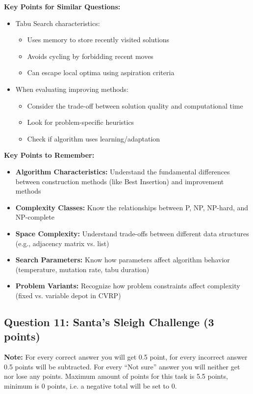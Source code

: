 \begin{enumerate}[label=\alph*)]
\textbf{Key Points for Similar Questions:}
\begin{itemize}
\item Tabu Search characteristics:
  \begin{itemize}
  \item Uses memory to store recently visited solutions
  \item Avoids cycling by forbidding recent moves
  \item Can escape local optima using aspiration criteria
  \end{itemize}
\item When evaluating improving methods:
  \begin{itemize}
  \item Consider the trade-off between solution quality and computational time
  \item Look for problem-specific heuristics
  \item Check if algorithm uses learning/adaptation
  \end{itemize}
\end{itemize}
\end{enumerate}

\textbf{Key Points to Remember:}
\begin{itemize}
\item \textbf{Algorithm Characteristics:} Understand the fundamental differences between construction methods (like Best Insertion) and improvement methods
\item \textbf{Complexity Classes:} Know the relationships between P, NP, NP-hard, and NP-complete
\item \textbf{Space Complexity:} Understand trade-offs between different data structures (e.g., adjacency matrix vs. list)
\item \textbf{Search Parameters:} Know how parameters affect algorithm behavior (temperature, mutation rate, tabu duration)
\item \textbf{Problem Variants:} Recognize how problem constraints affect complexity (fixed vs. variable depot in CVRP)
\end{itemize}

\subsection{Question 11: Santa's Sleigh Challenge (3 points)}
\textbf{Note:} For every correct answer you will get 0.5 point, for every incorrect answer 0.5 points will be subtracted. For every ``Not sure'' answer you will neither get nor lose any points. Maximum amount of points for this task is 5.5 points, minimum is 0 points, i.e. a negative total will be set to 0.

